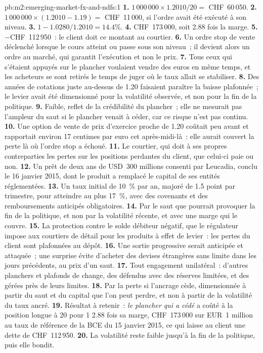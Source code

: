 \begin{solution}{pb:m2:emerging-market-fx-and-ndfs:1}
\textbf{1.} $1\,000\,000 \times 1.2010/20 = $ CHF~60\,050.
\textbf{2.} $1\,000\,000 \times (1.2010 - 1.19) = $ CHF~11\,000, si l'ordre avait été exécuté à
son niveau.
\textbf{3.} $1 - 1.0280/1.2010 = 14.4\%$.
\textbf{4.} CHF~173\,000, soit 2.88 fois la marge.
\textbf{5.} $-$CHF~112\,950~: le client doit ce montant au courtier.
\textbf{6.} Un ordre stop de vente déclenché lorsque le cours atteint ou passe sous son niveau~; il devient alors
un ordre au marché, qui garantit l'exécution et non le prix.
\textbf{7.} Tous ceux qui s'étaient appuyés sur le plancher voulaient vendre des euros en même temps, et
les acheteurs se sont retirés le temps de juger où le taux allait se stabiliser.
\textbf{8.} Des années de cotations juste au-dessus de 1.20 faisaient paraître la baisse plafonnée~; le
levier avait été dimensionné pour la volatilité observée, et non pour la fin de la politique.
\textbf{9.} Faible, reflet de la crédibilité du plancher~; elle ne mesurait pas l'ampleur du
saut si le plancher venait à céder, car ce risque n'est pas continu.
\textbf{10.} Une option de vente de prix d'exercice proche de 1.20 coûtait peu avant et rapportait environ 17 centimes
par euro cet après-midi-là~: elle aurait couvert la perte là où l'ordre stop a échoué.
\textbf{11.} Le courtier, qui doit à ses propres contreparties les pertes sur les positions
perdantes du client, que celui-ci paie ou non.
\textbf{12.} Un prêt de deux ans de USD~300 millions consenti par Leucadia, conclu le 16
janvier 2015, dont le produit a remplacé le capital de ses entités réglementées.
\textbf{13.} Un taux initial de 10~\% par an, majoré de 1.5 point par trimestre, pour atteindre au plus
17~\%, avec des covenants et des remboursements anticipés obligatoires.
\textbf{14.} Par le saut que pourrait provoquer la fin de la politique, et non par la volatilité récente,
et avec une marge qui le couvre.
\textbf{15.} La protection contre le solde débiteur négatif, que le régulateur impose aux
courtiers de détail pour les produits à effet de levier~: les pertes du client sont plafonnées au dépôt.
\textbf{16.} Une sortie progressive serait anticipée et attaquée~; une surprise évite
d'acheter des devises étrangères sans limite dans les jours précédents, au prix d'un saut.
\textbf{17.} Tout engagement unilatéral~: d'autres planchers et plafonds de change, des 
défendus avec des réserves limitées, et des  gérées près de leurs limites.
\textbf{18.} Par la perte si l'ancrage cède, dimensionnée à partir du saut et du capital
que l'on peut perdre, et non à partir de la volatilité du taux ancré.
\textbf{19.} Résultat à retenir~: \emph{le plancher qui a cédé} a coûté à la position longue à 20 pour 1
2.88 fois sa marge, CHF~173\,000 sur EUR~1 million au taux de référence de la BCE du
15 janvier 2015, ce qui laisse au client une dette de CHF~112\,950.
\textbf{20.} La volatilité reste faible jusqu'à la fin de la politique, puis elle bondit.
\end{solution}

